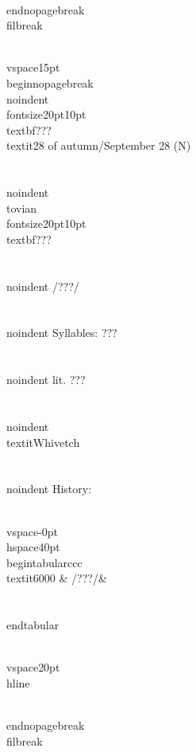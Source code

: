 \\end{nopagebreak}
\\filbreak



\\vspace{15pt}
\\begin{nopagebreak}
\\noindent{\\fontsize{20pt}{10pt}\\textbf{???} } \\textit{28 of autumn/September 28} (N)\\\\
\\noindent {\\tovian \\fontsize{20pt}{10pt} \\textbf{???} }\\\\
\\noindent /???/\\\\
\\noindent Syllables: ???\\\\
\\noindent lit. ???\\\\
\\noindent \\textit{Whivetch}\\\\


\\noindent History:

\\vspace{-0pt}
\\hspace{40pt}
\\begin{tabular}{ccc}
\\textit{6000} & /???/& \\\\
\\end{tabular}

\\vspace{20pt}\\hline

\\end{nopagebreak}
\\filbreak



